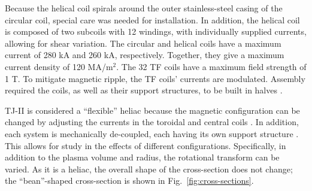 \documentclass[a4paper]{article}
\begin{document}
Because the helical coil spirals around the outer stainless-steel casing of the circular coil, special care was needed for installation.
In addition, the helical coil is composed of two subcoils with 12 windings, with individually supplied currents, allowing for shear variation.
The circular and helical coils have a maximum current of 280 kA and 260 kA, respectively.
Together, they give a maximum current density of 120 MA/m$^2$.
The 32 TF coils have a maximum field strength of 1 T.
To mitigate magnetic ripple, the TF coils' currents are modulated.
Assembly required the coils, as well as their support structures, to be built in halves \cite{ascasibar_overview_2001}.

TJ-II is considered a ``flexible'' heliac because the magnetic configuration can be changed by adjusting the currents in the toroidal and central coils \cite{solano_study_1988}.
In addition, each system is mechanically de-coupled, each having its own support structure \cite{ascasibar_overview_2001}.
This allows for study in the effects of different configurations.
Specifically, in addition to the plasma volume and radius, the rotational transform can be varied.
As it is a heliac, the overall shape of the cross-section does not change; the ``bean''-shaped cross-section is shown in Fig.~\ref{fig:cross-sections}.
\end{document}
